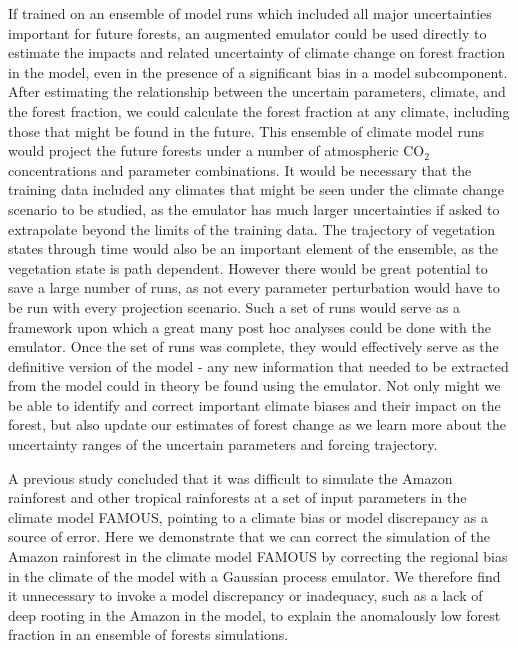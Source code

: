 \documentclass[gmd, manuscript]{copernicus}
\begin{document}
If trained on an ensemble of model runs which included all major uncertainties important for future forests, an augmented emulator could be used directly to estimate the impacts and related uncertainty of climate change on forest fraction in the model, even in the presence of a significant bias in a model subcomponent. After estimating the relationship between the uncertain parameters, climate, and the forest fraction, we could calculate the forest fraction at any climate, including those that might be found in the future. This ensemble of climate model runs would project the future forests under a number of atmospheric CO$_{2}$ concentrations and parameter combinations. It would be necessary that the training data included any climates that might be seen under the climate change scenario to be studied, as the emulator has much larger uncertainties if asked to extrapolate beyond the limits of the training data. The trajectory of vegetation states through time would also be an important element of the ensemble, as the vegetation state is path dependent. However there would be great potential to save a large number of runs, as not every parameter perturbation would have to be run with every projection scenario. Such a set of runs would serve as a framework upon which a great many post hoc analyses could be done with the emulator. Once the set of runs was complete, they would effectively serve as the definitive version of the model - any new information that needed to be extracted from the model could in theory be found using the emulator. Not only might we be able to identify and correct important climate biases and their impact on the forest, but also update our estimates of forest change as we learn more about the uncertainty ranges of the uncertain parameters and forcing trajectory.

\conclusions \label{sec:conclusions}

A previous study \citep{mcneall2016impact} concluded that it was difficult to simulate the Amazon rainforest and other tropical rainforests at a set of input parameters in the climate model FAMOUS, pointing to a climate bias or model discrepancy as a source of error. Here we demonstrate that we can correct the simulation of the Amazon rainforest in the climate model FAMOUS by correcting the regional bias in the climate of the model with a Gaussian process emulator. We therefore find it unnecessary to invoke a model discrepancy or inadequacy, such as a lack of deep rooting in the Amazon in the model, to explain the anomalously low forest fraction in an ensemble of forests simulations.  
\end{document}
